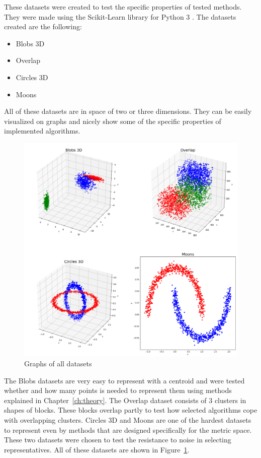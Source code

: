 \documentclass[thesis=B,english]{FITthesis}[2012/10/20]
\begin{document}
These datasets were created to test the specific properties of tested methods.
They were made using the Scikit-Learn library for Python 3 \cite{scikit-learn}.
The datasets created are the following:
\begin{itemize}
    \item Blobs 3D
    \item Overlap
    \item Circles 3D
    \item Moons
\end{itemize}
All of these datasets are in space of two or three dimensions.
They can be easily visualized on graphs and nicely show some of the specific properties of implemented algorithms.
\begin{figure}
  \includegraphics[width=\linewidth]{img/datasets.png}
  \caption{Graphs of all datasets}
  \label{img:datasets}
\end{figure}

The Blobs datasets are very easy to represent with a centroid and were tested whether and how many points is needed to represent them using methods explained in Chapter~\ref{ch:theory}.
The Overlap dataset consists of 3 clusters in shapes of blocks.
These blocks overlap partly to test how selected algorithms cope with overlapping clusters.
Circles 3D and Moons are one of the hardest datasets to represent even by methods that are designed specifically for the metric space.
These two datasets were chosen to test the resistance to noise in selecting representatives.
All of these datasets are shown in Figure~\ref{img:datasets}.
\end{document}
